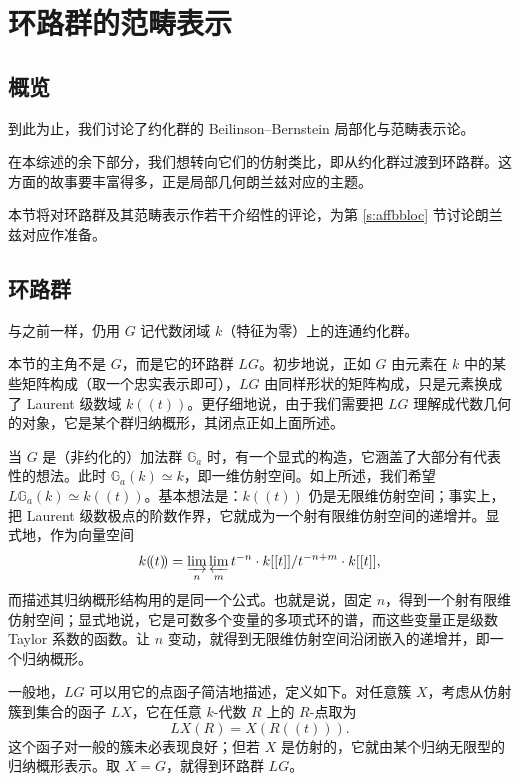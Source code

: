 \section{环路群的范畴表示}

\label{s:catloop}

\subsection{概览}

\ssszh 到此为止，我们讨论了约化群的 Beilinson--Bernstein 局部化与范畴表示论。

在本综述的余下部分，我们想转向它们的仿射类比，即从约化群过渡到环路群。这方面的故事要丰富得多，正是局部几何朗兰兹对应的主题。

本节将对环路群及其范畴表示作若干介绍性的评论，为第 \ref{s:affbbloc} 节讨论朗兰兹对应作准备。

\subsection{环路群}

\ssszh 与之前一样，仍用 $G$ 记代数闭域 $k$（特征为零）上的连通约化群。

本节的主角不是 $G$，而是它的环路群 $LG$。初步地说，正如 $G$ 由元素在 $k$ 中的某些矩阵构成（取一个忠实表示即可），$LG$ 由同样形状的矩阵构成，只是元素换成了 Laurent 级数域 $k(\!(t)\!)$。更仔细地说，由于我们需要把 $LG$ 理解成代数几何的对象，它是某个群归纳概形，其闭点正如上面所述。

\begin{ex}\label{ex:ga} 当 $G$ 是（非约化的）加法群 $\mathbb{G}_a$ 时，有一个显式的构造，它涵盖了大部分有代表性的想法。此时 $\mathbb{G}_a(k) \simeq k$，即一维仿射空间。如上所述，我们希望 $L\mathbb{G}_a(k) \simeq k(\!(t)\!)$。基本想法是：$k(\!(t)\!)$ 仍是无限维仿射空间；事实上，把 Laurent 级数极点的阶数作界，它就成为一个射有限维仿射空间的递增并。显式地，作为向量空间
%
\[
  k(\!(t)\!) = \varinjlim_n \varprojlim_m t^{-n} \cdot k[[t]] / t^{-n+m}
  \cdot k[[t]],
\]
%
而描述其归纳概形结构用的是同一个公式。也就是说，固定 $n$，得到一个射有限维仿射空间；显式地说，它是可数多个变量的多项式环的谱，而这些变量正是级数 Taylor 系数的函数。让 $n$ 变动，就得到无限维仿射空间沿闭嵌入的递增并，即一个归纳概形。
\end{ex}

\begin{re} 一般地，$LG$ 可以用它的点函子简洁地描述，定义如下。对任意簇 $X$，考虑从仿射簇到集合的函子 $LX$，它在任意 $k$-代数 $R$ 上的 $R$-点取为
	\[
	     LX(R) = X(R(\!(t)\!) ).
	\]
	这个函子对一般的簇未必表现良好；但若 $X$ 是仿射的，它就由某个归纳无限型的归纳概形表示。取 $X = G$，就得到环路群 $LG$。
\end{re}

